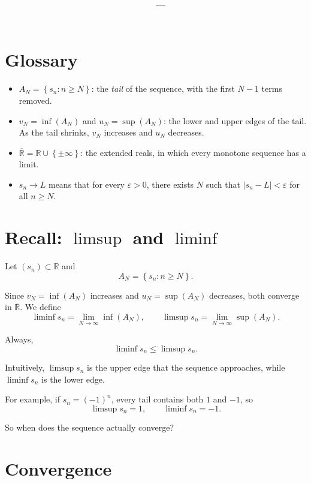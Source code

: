\documentclass[11pt]{article}
\title{\vspace{-1.5em}\textbf{\coursename\ -- \lecturetitle}}
\author{\studentname}
\date{\lecturedate}
\newcommand{\R}{\mathbb{R}}
\newcommand{\1}{\mathbf{1}}
\newcommand{\eps}{\varepsilon}
\newcommand{\abs}[1]{\left\lvert#1\right\rvert}
\newcommand{\set}[1]{\left\{#1\right\}}
\theoremstyle{notestyle}
\theoremstyle{definition}
\begin{document}
\maketitle

\section{Glossary}

\begin{itemize}
    \item $A_N=\set{s_n:n\ge N}$: the \textit{tail} of the sequence, with the first
    $N-1$ terms removed.

    \item $v_N=\inf(A_N)$ and $u_N=\sup(A_N)$: the lower and upper edges of the tail.
    As the tail shrinks, $v_N$ increases and $u_N$ decreases.

    \item $\overline{\R}=\R\cup\set{\pm\infty}$: the extended reals, in which every
    monotone sequence has a limit.

    \item $s_n\to L$ means that for every $\eps>0$, there exists $N$ such that
    $\abs{s_n-L}<\eps$ for all $n\ge N$.
\end{itemize}

\section{Recall: $\limsup$ and $\liminf$}

Let $(s_n)\subset\R$ and
\[
A_N=\set{s_n:n\ge N}.
\]

Since $v_N=\inf(A_N)$ increases and $u_N=\sup(A_N)$ decreases, both converge in
$\overline{\R}$. We define
\[
\liminf s_n=\lim_{N\to\infty}\inf(A_N),
\qquad
\limsup s_n=\lim_{N\to\infty}\sup(A_N).
\]

Always,
\[
\liminf s_n\le\limsup s_n.
\]

\par
Intuitively, $\limsup s_n$ is the upper edge that the sequence approaches, while
$\liminf s_n$ is the lower edge.

\par
For example, if $s_n=(-1)^n$, every tail contains both $1$ and $-1$, so
\[
\limsup s_n=1,
\qquad
\liminf s_n=-1.
\]

\par
So when does the sequence actually converge?

\section{Convergence}
\end{document}
